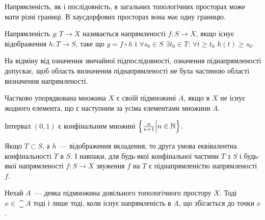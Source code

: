 \begin{remark}
    Напрямленість, як і послідовність, в загальних топологічних просторах може мати різні границі. В хаусдорфових просторах вона має одну границю.
\end{remark}

\begin{definition}
    Напрямленість $g: T \to X$ називається  напрямленості $f: S \to X$, якщо існує відображення $h: T \to S$, таке що $g = f \circ h$ і $\forall s_0 \in S$ $\exists t_0 \in T$: $\forall t \ge t_0$ $h(t) \ge s_0$.
\end{definition}

\begin{remark}
    На відміну від означення звичайної підпослідовності, означення піднапрямленості допускає, щоб область визначення піднапрямленості не була частиною області визначення напрямленості.
\end{remark}

\begin{definition}
    Частково упорядкована множина $X$ є  своїй підмножині $A$, якщо в $X$ не існує жодного елемента, що є наступним за усіма елементами множини $A$.
\end{definition}

\begin{example}
    Інтервал $(0, 1)$ є конфінальним множині $\left\{ \frac{n}{n + 1} \middle| n \in \mathbb{N} \right\}$.
\end{example}

\begin{remark}
    Якщо $T \subset S$, а $h$~--- відображення вкладення, то друга умова еквівалентна конфінальності $T$ в $S$. І навпаки, для будь-якої конфінальної частини $T$ з $S$ і будь-якої напрямленості $f: S \to X$ звуження $f$ на $T$ є піднапрямленістю напрямленості $f$.
\end{remark}

\begin{theorem}[Бірхгофа]
    Нехай $A$~--- деяка підмножина довільного топологічного простору $X$. Тоді $x \in \closure A$ тоді і лише тоді, коли існує напрямленість в $A$, що збігається до точки $x$.
\end{theorem}

